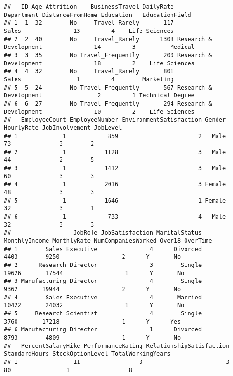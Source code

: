 \documentclass[
]{article}
\begin{document}
\begin{verbatim}
##   ID Age Attrition    BusinessTravel DailyRate             Department DistanceFromHome Education   EducationField
## 1  1  32        No     Travel_Rarely       117                  Sales               13         4    Life Sciences
## 2  2  40        No     Travel_Rarely      1308 Research & Development               14         3          Medical
## 3  3  35        No Travel_Frequently       200 Research & Development               18         2    Life Sciences
## 4  4  32        No     Travel_Rarely       801                  Sales                1         4        Marketing
## 5  5  24        No Travel_Frequently       567 Research & Development                2         1 Technical Degree
## 6  6  27        No Travel_Frequently       294 Research & Development               10         2    Life Sciences
##   EmployeeCount EmployeeNumber EnvironmentSatisfaction Gender HourlyRate JobInvolvement JobLevel
## 1             1            859                       2   Male         73              3        2
## 2             1           1128                       3   Male         44              2        5
## 3             1           1412                       3   Male         60              3        3
## 4             1           2016                       3 Female         48              3        3
## 5             1           1646                       1 Female         32              3        1
## 6             1            733                       4   Male         32              3        3
##                  JobRole JobSatisfaction MaritalStatus MonthlyIncome MonthlyRate NumCompaniesWorked Over18 OverTime
## 1        Sales Executive               4      Divorced          4403        9250                  2      Y       No
## 2      Research Director               3        Single         19626       17544                  1      Y       No
## 3 Manufacturing Director               4        Single          9362       19944                  2      Y       No
## 4        Sales Executive               4       Married         10422       24032                  1      Y       No
## 5     Research Scientist               4        Single          3760       17218                  1      Y      Yes
## 6 Manufacturing Director               1      Divorced          8793        4809                  1      Y       No
##   PercentSalaryHike PerformanceRating RelationshipSatisfaction StandardHours StockOptionLevel TotalWorkingYears
## 1                11                 3                        3            80                1                 8

\end{verbatim}
\end{document}
